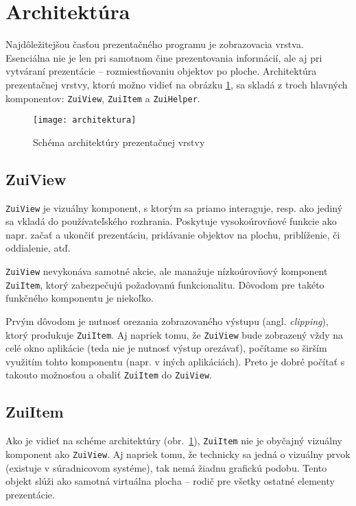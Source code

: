 \section{Architektúra}

Najdôležitejšou časťou prezentačného programu je zobrazovacia vrstva. Esenciálna nie je len pri samotnom čine prezentovania informácií, ale aj pri vytváraní prezentácie -- rozmiestňovaniu objektov po ploche. Architektúra prezentačnej vrstvy, ktorú možno vidieť na obrázku \ref{fig:schema}, sa skladá z troch hlavných komponentov: \texttt{ZuiView}, \texttt{ZuiItem} a \texttt{ZuiHelper}.

\begin{figure}
 \centering
 \texttt{[image: architektura]}
 \caption{Schéma architektúry prezentačnej vrstvy\label{fig:schema}}
\end{figure}

\subsection{ZuiView}
\texttt{ZuiView} je vizuálny komponent, s ktorým sa priamo interaguje, resp. ako jediný sa vkladá do používateľského rozhrania. Poskytuje vysokoúrovňové funkcie ako napr. začať a ukončiť prezentáciu, pridávanie objektov na plochu, priblíženie, či oddialenie, atď.

\texttt{ZuiView} nevykonáva samotné akcie, ale manažuje nízkoúrovňový komponent \texttt{ZuiItem}, ktorý zabezpečujú požadovanú funkcionalitu. Dôvodom pre takéto  funkčného komponentu je niekoľko.

Prvým dôvodom je nutnosť orezania zobrazovaného výstupu (angl. \textit{clipping}), ktorý produkuje \texttt{ZuiItem}. Aj napriek tomu, že \texttt{ZuiView} bude zobrazený vždy na celé okno aplikácie (teda nie je nutnosť výstup orezávať), počítame so širším využitím tohto komponentu (napr. v iných aplikáciách). Preto je dobré počítať s takouto možnosťou a obaliť \texttt{ZuiItem} do \texttt{ZuiView}.

\subsection{ZuiItem}

Ako je vidieť na schéme architektúry (obr.~\ref{fig:schema}), \texttt{ZuiItem} nie je obyčajný vizuálny komponent ako \texttt{ZuiView}. Aj napriek tomu, že technicky sa jedná o vizuálny prvok (existuje v súradnicovom systéme), tak nemá žiadnu grafickú podobu. Tento objekt slúži ako samotná virtuálna plocha -- rodič pre všetky ostatné elementy prezentácie.

